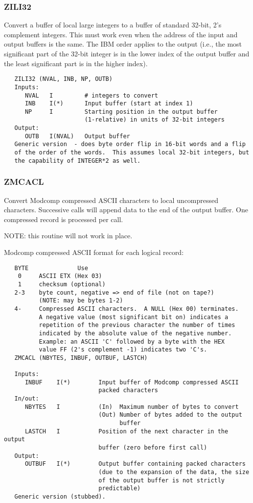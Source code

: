 \subsubsection{ZILI32}
Convert a buffer of local large integers to a buffer of standard
32-bit, 2's complement integers.  This must work even when the
address of the input and output buffers is the same.  The IBM order
applies to the output (i.e., the most significant part of the 32-bit
integer is in the lower index of the output buffer and the least
significant part is in the higher index).
\begin{verbatim}
   ZILI32 (NVAL, INB, NP, OUTB)
   Inputs:
      NVAL   I         # integers to convert
      INB    I(*)      Input buffer (start at index 1)
      NP     I         Starting position in the output buffer
                       (1-relative) in units of 32-bit integers
   Output:
      OUTB   I(NVAL)   Output buffer
   Generic version  - does byte order flip in 16-bit words and a flip
   of the order of the words.  This assumes local 32-bit integers, but
   the capability of INTEGER*2 as well.
\end{verbatim}

\subsubsection{ZMCACL}
Convert Modcomp compressed ASCII characters to local uncompressed
characters.  Successive calls will append data to the end of the
output buffer.  One compressed record is processed per call.

NOTE: this routine will not work in place.

Modcomp compressed ASCII format for each logical record:
\begin{verbatim}
   BYTE              Use
    0     ASCII ETX (Hex 03)
    1     checksum (optional)
   2-3    byte count, negative => end of file (not on tape?)
          (NOTE: may be bytes 1-2)
   4-     Compressed ASCII characters.  A NULL (Hex 00) terminates.
          A negative value (most significant bit on) indicates a
          repetition of the previous character the number of times
          indicated by the absolute value of the negative number.
          Example: an ASCII 'C' followed by a byte with the HEX
          value FF (2's complement -1) indicates two 'C's.
   ZMCACL (NBYTES, INBUF, OUTBUF, LASTCH)

   Inputs:
      INBUF    I(*)        Input buffer of Modcomp compressed ASCII
                           packed characters
   In/out:
      NBYTES   I           (In)  Maximum number of bytes to convert
                           (Out) Number of bytes added to the output
                                 buffer
      LASTCH   I           Position of the next character in the output
                           buffer (zero before first call)
   Output:
      OUTBUF   I(*)        Output buffer containing packed characters
                           (due to the expansion of the data, the size
                           of the output buffer is not strictly
                           predictable)
   Generic version (stubbed).
\end{verbatim}

